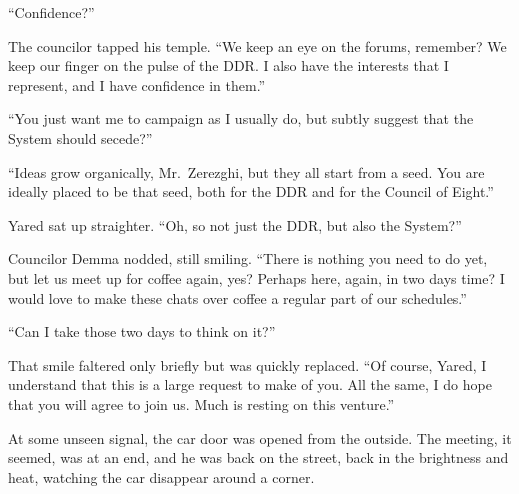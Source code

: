 ``Confidence?''

The councilor tapped his temple. ``We keep an eye on the forums, remember? We keep our finger on the pulse of the DDR. I also have the interests that I represent, and I have confidence in them.''

``You just want me to campaign as I usually do, but subtly suggest that the System should secede?''

``Ideas grow organically, Mr.~Zerezghi, but they all start from a seed. You are ideally placed to be that seed, both for the DDR and for the Council of Eight.''

Yared sat up straighter. ``Oh, so not just the DDR, but also the System?''

Councilor Demma nodded, still smiling. ``There is nothing you need to do yet, but let us meet up for coffee again, yes? Perhaps here, again, in two days time? I would love to make these chats over coffee a regular part of our schedules.''

``Can I take those two days to think on it?''

That smile faltered only briefly but was quickly replaced. ``Of course, Yared, I understand that this is a large request to make of you. All the same, I do hope that you will agree to join us. Much is resting on this venture.''

At some unseen signal, the car door was opened from the outside. The meeting, it seemed, was at an end, and he was back on the street, back in the brightness and heat, watching the car disappear around a corner.
